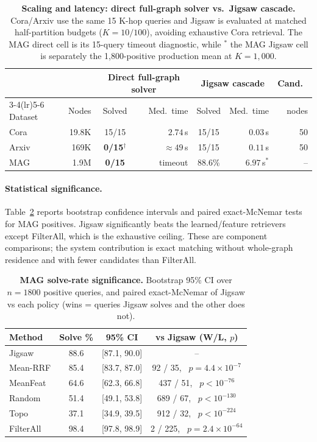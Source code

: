 \documentclass[runningheads]{llncs}
\begin{document}
\begin{table}[H]
\centering
\caption{\textbf{Scaling and latency: direct full-graph solver vs.\ Jigsaw cascade.} Cora/Arxiv use the same 15 K-hop queries and Jigsaw is evaluated at matched half-partition budgets ($K=10/100$), avoiding exhaustive Cora retrieval. The MAG direct cell is its 15-query timeout diagnostic, while $^\ast$ the MAG Jigsaw cell is separately the 1,800-positive production mean at $K=1{,}000$.}
\label{tab:scaling_latency}
\small
\begin{tabular}{l r c r c r r}
\toprule
 & & \multicolumn{2}{c}{Direct full-graph solver} & \multicolumn{2}{c}{Jigsaw cascade} & Cand.\ \\
\cmidrule(lr){3-4}\cmidrule(lr){5-6}
Dataset & Nodes & Solved & Med.\ time & Solved & Med.\ time & nodes \\
\midrule
Cora  & 19.8K & 15/15 & $2.74$\,s & 15/15 & $\mathbf{0.03}$\,s & 50 \\
Arxiv & 169K  & \textbf{0/15}$^\dagger$ & ${\approx}49$\,s & 15/15 & $\mathbf{0.11}$\,s & 50 \\
MAG   & 1.9M  & \textbf{0/15} & timeout & 88.6\% & $6.97$\,s$^\ast$ & -- \\
\bottomrule
\end{tabular}
\end{table}

\paragraph{Statistical significance.}
Table~\ref{tab:significance} reports bootstrap confidence intervals and paired exact-McNemar tests for MAG positives. Jigsaw significantly beats the learned/feature retrievers except FilterAll, which is the exhaustive ceiling. These are component comparisons; the system contribution is exact matching without whole-graph residence and with fewer candidates than FilterAll.

\begin{table}[H]
\centering
\caption{\textbf{MAG solve-rate significance.} Bootstrap 95\% CI over $n{=}1800$ positive queries, and paired exact-McNemar of Jigsaw vs each policy (wins = queries Jigsaw solves and the other does not).}
\label{tab:significance}
\small
\setlength{\tabcolsep}{6pt}
\begin{tabular}{lccc}
\toprule
\textbf{Method} & \textbf{Solve \%} & \textbf{95\% CI} & \textbf{vs Jigsaw (W/L, $p$)} \\
\midrule
Jigsaw    & 88.6 & [87.1, 90.0] & -- \\
Mean-RRF  & 85.4 & [83.7, 87.0] & 92 / 35, \ $p{=}4.4{\times}10^{-7}$ \\
MeanFeat  & 64.6 & [62.3, 66.8] & 437 / 51, \ $p{<}10^{-76}$ \\
Random    & 51.4 & [49.1, 53.8] & 689 / 67, \ $p{<}10^{-130}$ \\
Topo      & 37.1 & [34.9, 39.5] & 912 / 32, \ $p{<}10^{-224}$ \\
FilterAll & 98.4 & [97.8, 98.9] & 2 / 225, \ $p{=}2.4{\times}10^{-64}$ \\
\bottomrule
\end{tabular}
\end{table}
\end{document}
